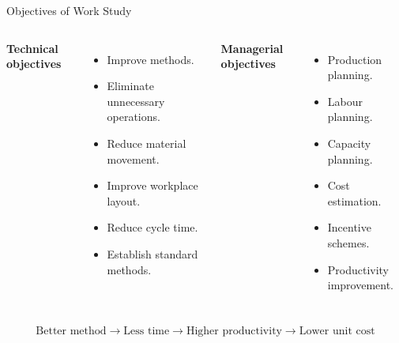 \documentclass[aspectratio=169,10pt]{beamer}
\begin{document}
\begin{frame}[shrink=18]{Objectives of Work Study}
\small

\begin{columns}[T]


\textbf{Technical objectives}

\begin{itemize}
    \item Improve methods.
    \item Eliminate unnecessary operations.
    \item Reduce material movement.
    \item Improve workplace layout.
    \item Reduce cycle time.
    \item Establish standard methods.
\end{itemize}


\textbf{Managerial objectives}

\begin{itemize}
    \item Production planning.
    \item Labour planning.
    \item Capacity planning.
    \item Cost estimation.
    \item Incentive schemes.
    \item Productivity improvement.
\end{itemize}

\end{columns}

\vspace{6pt}

\[
\boxed{
\text{Better method}
\rightarrow
\text{Less time}
\rightarrow
\text{Higher productivity}
\rightarrow
\text{Lower unit cost}
}
\]

\end{frame}

\end{document}
